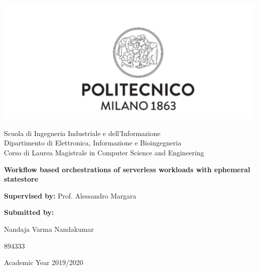 \documentclass[12pt,titlepage]{article}
\date{\today}
\title{}
\begin{document}
\begin{titlepage}
   \begin{center}

       \includegraphics[width=1.0\textwidth]{./thesis_images/university.png}

       Scuola di Ingegneria Industriale e dell’Informazione\\
       Dipartimento di Elettronica, Informazione e Bioingegneria\\
       Corso di Laurea Magistrale in Computer Science and Engineering \\
       \date{\today}



       \vspace{2.8cm}
       \textbf{Workflow based orchestrations of serverless workloads with ephemeral statestore}

       \vspace{0.5cm}

       \vfill
       \vspace{1.5cm}

       \textbf{Supervised by:}
       Prof. Alessandro Margara

       \vspace{0.5cm}
       \textbf{Submitted by:}

       Nandaja Varma Nandakumar

       894333

       \vspace{1.0cm}
       Academic Year 2019/2020

   \end{center}
\end{titlepage}
\end{document}
